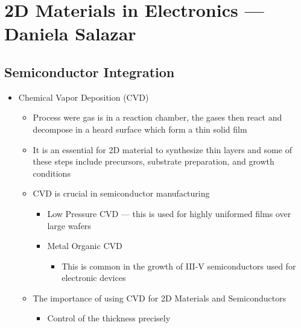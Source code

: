 \documentclass[conference]{IEEEtran}
\begin{document}
\section{2D Materials in Electronics — Daniela Salazar}

\subsection{Semiconductor Integration}

\begin{itemize}

  \item Chemical Vapor Deposition (CVD)

    \begin{itemize}

      \item Process were gas is in a reaction chamber, the gases then react and decompose in a heard surface which form a thin solid film 

      \item It is an essential for 2D material to synthesize thin layers and some of these steps include precursors, substrate preparation, and growth conditions 

      \item CVD is crucial in semiconductor manufacturing 

        \begin{itemize}

          \item Low Pressure CVD — this is used for highly uniformed films over large wafers 

          \item Metal Organic CVD

            \begin{itemize}

              \item This is common in the growth of III-V semiconductors used for electronic devices 

            \end{itemize}

        \end{itemize}

      \item The importance of using CVD for 2D Materials and Semiconductors 

        \begin{itemize}

          \item Control of the thickness precisely 


\end{itemize}
\end{itemize}
\end{itemize}
\end{document}
